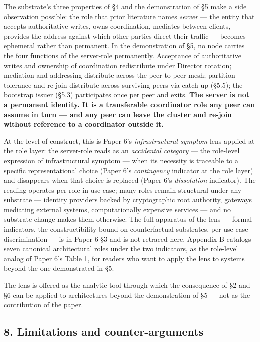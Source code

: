 \documentclass[
]{article}
\begin{document}
The substrate's three properties of §4 and the demonstration of §5 make
a side observation possible: the role that prior literature names
\emph{server} --- the entity that accepts authoritative writes, owns
coordination, mediates between clients, provides the address against
which other parties direct their traffic --- becomes ephemeral rather
than permanent. In the demonstration of §5, no node carries the four
functions of the server-role permanently. Acceptance of authoritative
writes and ownership of coordination redistribute under Director
rotation; mediation and addressing distribute across the peer-to-peer
mesh; partition tolerance and re-join distribute across surviving peers
via catch-up (§5.5); the bootstrap issuer (§5.3) participates once per
peer and exits. \textbf{The server is not a permanent identity. It is a
transferable coordinator role any peer can assume in turn --- and any
peer can leave the cluster and re-join without reference to a
coordinator outside it.}

At the level of construct, this is Paper 6's \emph{infrastructural
symptom} lens applied at the role layer: the server-role reads as an
\emph{accidental category} --- the role-level expression of
infrastructural symptom --- when its necessity is traceable to a
specific representational choice (Paper 6's \emph{contingency} indicator
at the role layer) and disappears when that choice is replaced (Paper
6's \emph{dissolution} indicator). The reading operates per
role-in-use-case; many roles remain structural under any substrate ---
identity providers backed by cryptographic root authority, gateways
mediating external systems, computationally expensive services --- and
no substrate change makes them otherwise. The full apparatus of the lens
--- formal indicators, the constructibility bound on counterfactual
substrates, per-use-case discrimination --- is in Paper 6 §3 and is not
retraced here. Appendix B catalogs seven canonical architectural roles
under the two indicators, as the role-level analog of Paper 6's Table 1,
for readers who want to apply the lens to systems beyond the one
demonstrated in §5.

The lens is offered as the analytic tool through which the consequence
of §2 and §6 can be applied to architectures beyond the demonstration of
§5 --- not as the contribution of the paper.

\subsection{8. Limitations and
counter-arguments}\label{limitations-and-counter-arguments}
\end{document}
